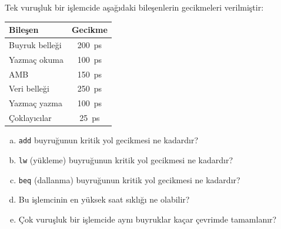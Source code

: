 \begin{alistirma}[\orta]
Tek vuruşluk bir işlemcide aşağıdaki bileşenlerin gecikmeleri verilmiştir:

\begin{center}
\begin{tabular}{|l|c|}
\hline
\textbf{Bileşen} & \textbf{Gecikme} \\ \hline
Buyruk belleği & 200~ps \\ \hline
Yazmaç okuma & 100~ps \\ \hline
AMB & 150~ps \\ \hline
Veri belleği & 250~ps \\ \hline
Yazmaç yazma & 100~ps \\ \hline
Çoklayıcılar & 25~ps \\ \hline
\end{tabular}
\end{center}

\begin{enumerate}[(a)]
    \item \texttt{add} buyruğunun kritik yol gecikmesi ne kadardır?
    \item \texttt{lw} (yükleme) buyruğunun kritik yol gecikmesi ne kadardır?
    \item \texttt{beq} (dallanma) buyruğunun kritik yol gecikmesi ne kadardır?
    \item Bu işlemcinin en yüksek saat sıklığı ne olabilir?
    \item Çok vuruşluk bir işlemcide aynı buyruklar kaçar çevrimde tamamlanır?
\end{enumerate}
\end{alistirma}


